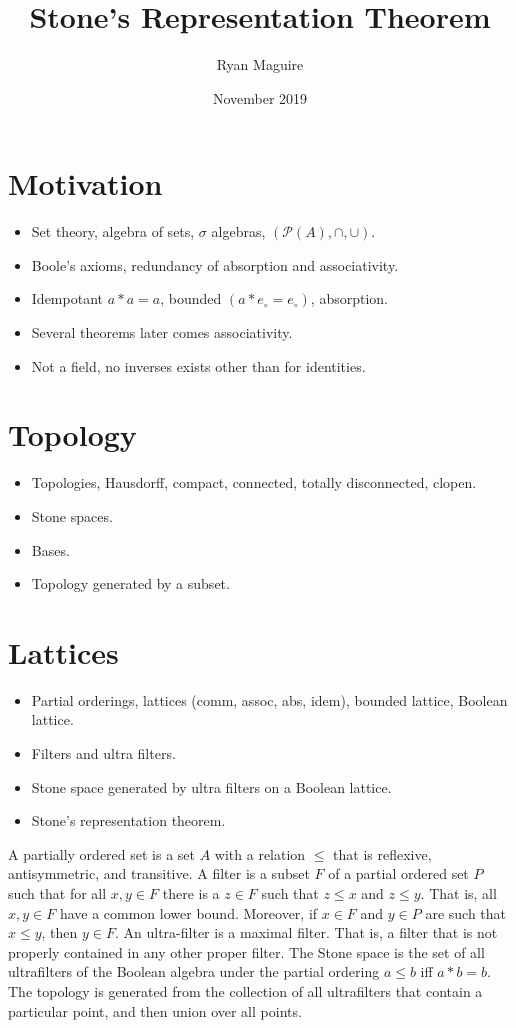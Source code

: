 \documentclass{article}
\title{Stone's Representation Theorem}
\author{Ryan Maguire}
\date{November 2019}
\begin{document}
    \maketitle
    \section{Motivation}
        \begin{itemize}
            \item Set theory, algebra of sets, $\sigma$ algebras, $(\mathcal{P}(A),\cap,\cup)$.
            \item Boole's axioms, redundancy of absorption and associativity.
            \item Idempotant $a*a=a$, bounded $(a*e_{\circ}=e_{\circ})$, absorption.
            \item Several theorems later comes associativity.
            \item Not a field, no inverses exists other than for identities.
        \end{itemize}
    \section{Topology}
        \begin{itemize}
            \item Topologies, Hausdorff, compact, connected, totally disconnected, clopen.
            \item Stone spaces.
            \item Bases.
            \item Topology generated by a subset.
        \end{itemize}
    \section{Lattices}
        \begin{itemize}
            \item Partial orderings, lattices (comm, assoc, abs, idem), bounded lattice, Boolean lattice.
            \item Filters and ultra filters.
            \item Stone space generated by ultra filters on a Boolean lattice.
            \item Stone's representation theorem.
        \end{itemize}
        A partially ordered set is a set $A$ with a relation $\leq$ that is reflexive,
        antisymmetric, and transitive. A filter is a subset $F$ of a partial ordered set $P$ such that
        for all $x,y\in{F}$ there is a $z\in{F}$ such that $z\leq{x}$ and $z\leq{y}$. That is, all
        $x,y\in{F}$ have a common lower bound. Moreover, if $x\in{F}$ and $y\in{P}$ are such that
        $x\leq{y}$, then $y\in{F}$. An ultra-filter is a maximal filter. That is, a filter that is
        not properly contained in any other proper filter. The Stone space is the set of all
        ultrafilters of the Boolean algebra under the partial ordering $a\leq{b}$ iff $a*b=b$.
        The topology is generated from the collection of all ultrafilters that contain a particular
        point, and then union over all points.
\end{document}
